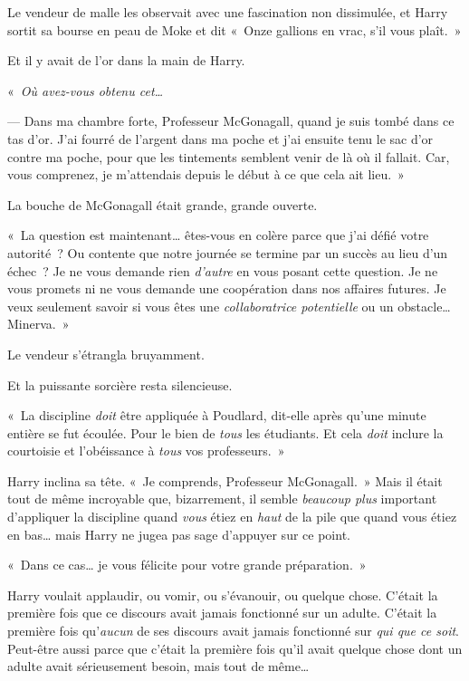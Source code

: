 Le vendeur de malle les observait avec une fascination non dissimulée, et Harry sortit sa bourse en peau de Moke et dit «~Onze gallions en vrac, s'il vous plaît.~»

Et il y avait de l'or dans la main de Harry.

«~\emph{Où avez-vous obtenu cet…}

--- Dans ma chambre forte, Professeur McGonagall, quand je suis tombé dans ce tas d'or. J'ai fourré de l'argent dans ma poche et j'ai ensuite tenu le sac d'or contre ma poche, pour que les tintements semblent venir de là où il fallait. Car, vous comprenez, je m'attendais depuis le début à ce que cela ait lieu.~»

La bouche de McGonagall était grande, grande ouverte.

«~La question est maintenant… êtes-vous en colère parce que j'ai défié votre autorité~? Ou contente que notre journée se termine par un succès au lieu d'un échec~? Je ne vous demande rien \emph{d'autre} en vous posant cette question. Je ne vous promets ni ne vous demande une coopération dans nos affaires futures. Je veux seulement savoir si vous êtes une \emph{collaboratrice potentielle} ou un obstacle… Minerva.~»

Le vendeur s'étrangla bruyamment.

Et la puissante sorcière resta silencieuse.

«~La discipline \emph{doit} être appliquée à Poudlard, dit-elle après qu'une minute entière se fut écoulée. Pour le bien de \emph{tous} les étudiants. Et cela \emph{doit} inclure la courtoisie et l'obéissance à \emph{tous} vos professeurs.~»

Harry inclina sa tête. «~Je comprends, Professeur McGonagall.~» Mais il était tout de même incroyable que, bizarrement, il semble \emph{beaucoup plus} important d'appliquer la discipline quand \emph{vous} étiez en \emph{haut} de la pile que quand vous étiez en bas… mais Harry ne jugea pas sage d'appuyer sur ce point.

«~Dans ce cas… je vous félicite pour votre grande préparation.~»

Harry voulait applaudir, ou vomir, ou s'évanouir, ou quelque chose. C'était la première fois que ce discours avait jamais fonctionné sur un adulte. C'était la première fois qu'\emph{aucun} de ses discours avait jamais fonctionné sur \emph{qui que ce soit}. Peut-être aussi parce que c'était la première fois qu'il avait quelque chose dont un adulte avait sérieusement besoin, mais tout de même…

